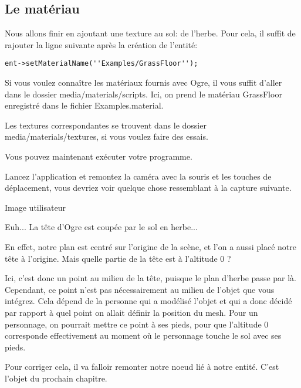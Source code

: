 \subsection{Le mat\'eriau}

Nous allons finir en ajoutant une texture au sol: de l'herbe. Pour cela, il suffit de rajouter la ligne suivante apr\`es la cr\'eation de l'entit\'e:
\begin{lstlisting}
ent->setMaterialName(''Examples/GrassFloor'');
\end{lstlisting}

Si vous voulez conna\^itre les mat\'eriaux fournis avec Ogre, il vous suffit d'aller dans le dossier media/materials/scripts. Ici, on prend le mat\'eriau GrassFloor enregistr\'e dans le fichier Examples.material. 

Les textures correspondantes se trouvent dans le dossier media/materials/textures, si vous voulez faire des essais.


Vous pouvez maintenant ex\'ecuter votre programme.

Lancez l'application et remontez la cam\'era avec la souris et les touches de d\'eplacement, vous devriez voir quelque chose ressemblant \`{a} la capture suivante.

Image utilisateur

Euh... La t\^ete d'Ogre est coup\'ee par le sol en herbe...

En effet, notre plan est centr\'e sur l'origine de la sc\`ene, et l'on a aussi plac\'e notre t\^ete \`{a} l'origine. Mais quelle partie de la t\^ete est \`{a} l'altitude 0 ?

Ici, c'est donc un point au milieu de la t\^ete, puisque le plan d'herbe passe par l\`{a}.
Cependant, ce point n'est pas n\'ecessairement au milieu de l'objet que vous int\'egrez. Cela d\'epend de la personne qui a mod\'elis\'e l'objet et qui a donc d\'ecid\'e par rapport \`{a} quel point on allait d\'efinir la position du mesh. Pour un personnage, on pourrait mettre ce point \`{a} ses pieds, pour que l'altitude 0 corresponde effectivement au moment o\`{u} le personnage touche le sol avec ses pieds.

Pour corriger cela, il va falloir remonter notre noeud li\'e \`{a} notre entit\'e. C'est l'objet du prochain chapitre.

































